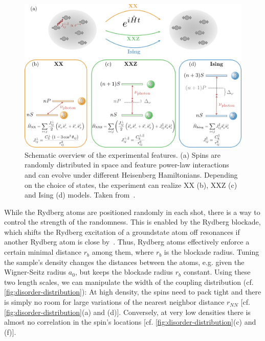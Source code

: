 \begin{figure}[htb]
	\centering
	\includegraphics[width=\textwidth]{gfx/part1/png/experiment_hamiltonians.png}
	\caption{Schematic overview of the experimental features. (a) Spins are randomly distributed in space and feature power-law interactions and can evolve under different Heisenberg Hamiltonians. Depending on the choice of states, the experiment can realize XX (b), XXZ (c) and Ising (d) models.
		Taken from~\cite{franzObservationAnisotropyindependentMagnetization2024}.}
	\label{fig:experimental-hamiltonians}
\end{figure}

While the Rydberg atoms are positioned randomly in each shot, there is a way to control the strength of the randomness. This is enabled by the Rydberg blockade, which shifts the Rydberg excitation of a groundstate atom off resonances if another Rydberg atom is close by~\cite{lukinDipoleBlockadeQuantum2001}. Thus, Rydberg atoms effectively enforce a certain minimal distance $r_b$ among them, where $r_b$ is the blockade radius. Tuning the sample's density changes the distances between the atoms, e.g. given the Wigner-Seitz radius $a_0$, but keeps the blockade radius $r_b$ constant. Using these two length scales, we can manipulate the width of the coupling distribution (cf. \autoref{fig:disorder-distribution}): At high density, the spins need to pack tight and there is simply no room for large variations of the nearest neighbor distance $r_{NN}$ [cf. \autoref{fig:disorder-distribution}(a) and (d)]. Conversely, at very low densities there is almost no correlation in the spin's locations [cf. \autoref{fig:disorder-distribution}(c) and (f)].

